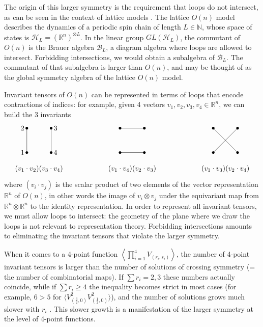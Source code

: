 \documentclass[12pt, a4paper]{article}
\newcommand{\vertices}{
\coordinate (base) at (0, 1);
\draw (0, 0) node[fill, circle, minimum size = 1.3mm, inner sep = 0]{};
  \draw (3, 0) node[fill, circle, minimum size = 1.3mm, inner sep = 0]{};
  \draw (0, 3) node[fill, circle, minimum size = 1.3mm, inner sep = 0]{};
  \draw (3, 3) node[fill, circle, minimum size = 1.3mm, inner sep = 0]{};
}
\theoremstyle{break}
\begin{document}
The origin of this larger symmetry is the requirement that loops do not intersect, as can be seen in the context of lattice models \cite{jrs22}. The lattice $O(n)$ model describes the dynamics of a periodic spin chain of length $L\in\mathbb{N}$, whose space of states is $\mathcal{H}_L=\left(\mathbb{R}^n\right)^{\otimes L}$. In the linear group $GL(\mathcal{H}_L)$, the commutant of $O(n)$ is the Brauer algebra $\mathcal{B}_L$, a diagram algebra where loops are allowed to intersect. Forbidding intersections, we would obtain a subalgebra of $\mathcal{B}_L$. The commutant of that subalgebra is larger than $O(n)$, and may be thought of as the global symmetry algebra of the lattice $O(n)$ model.

Invariant tensors of $O(n)$ can be represented in terms of loops that encode contractions of indices: for example, given 4 vectors $v_1,v_2,v_3,v_4\in \mathbb{R}^n$, we can build the 3 invariants 
\begin{align}
\begin{tikzpicture}[baseline=(base), scale = .4]
  \vertices
  \draw (0, 0) node [left]{$1$} -- (0, 3) node[left]{$2$};
  \draw (3, 0) node [right]{$4$} -- (3, 3) node[right]{$3$};
  \node at (1.5, -2) {$(v_1\cdot v_2)(v_3\cdot v_4)$};
 \end{tikzpicture}
 \hspace{2cm}
 \begin{tikzpicture}[baseline=(base), scale = .4]
  \vertices
 \draw (0, 3) -- (3, 3) ;
 \draw (0,0) -- (3,0);
 \node at (1.5, -2) {$(v_1\cdot v_4)(v_2\cdot v_3)$};
 \end{tikzpicture}
 \hspace{2cm}
 \begin{tikzpicture}[baseline=(base), scale = .4]
  \vertices
 \draw (0, 3) -- (3, 0) ;
  \draw (3, 3) -- (0, 0);
  \node at (1.5, -2) {$(v_1\cdot v_3)(v_2\cdot v_4)$};
 \end{tikzpicture}
\end{align}
where $(v_i\cdot v_j)$ is the scalar product of two elements of the vector representation $\mathbb{R}^n$ of $O(n)$, in other words the image of $v_i\otimes v_j$ under the equivariant map from $\mathbb{R}^n\otimes \mathbb{R}^n$ to the identity representation. In order to represent all invariant tensors, we must allow loops to intersect: the geometry of the plane where we draw the loops is not relevant to representation theory. Forbidding intersections amounts to eliminating the invariant tensors that violate the larger symmetry. 

When it comes to a 4-point function $\left<\prod_{i=1}^4 V_{(r_i,s_i)}\right>$, the number of 4-point invariant tensors is larger than the number of solutions of crossing symmetry (= the number of combinatorial maps). If $\sum r_i = 2, 3$ these numbers actually coincide, while if $\sum r_i\geq 4$ the inequality becomes strict in most cases (for example, $6>5$ for $\big\langle V_{(\frac32,0)}^2V_{(\frac12,0)}^2\big\rangle$), and the number of solutions grows much slower with $r_i$ \cite{gjnrs23}. This slower growth is a manifestation of the larger symmetry at the level of 4-point functions. 
\end{document}
